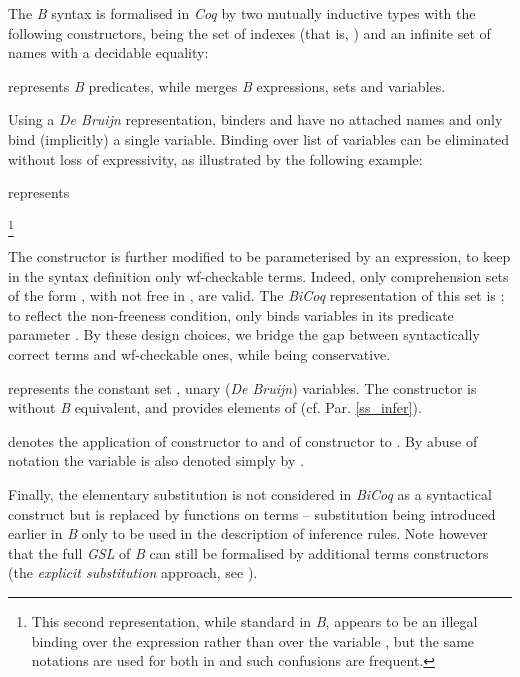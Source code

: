 \documentclass{llncs}
\begin{document}
The \emph{B} syntax is formalised in \emph{Coq} by two mutually inductive types with the 
following constructors,  being the set of indexes (that is, 
) and  an infinite set of names with a decidable 
equality:

 represents \emph{B} predicates, while  merges \emph{B} expressions, sets and 
variables.

Using a \emph{De Bruijn} representation, binders  and  have no attached 
names and only bind (implicitly) a single variable. Binding over list of variables can be 
eliminated without loss of expressivity, as illustrated by the following example:

\begin{example}\label{ss_syntax_e2}\small

represents

\footnote{This second representation, while standard in \emph{B}, appears to be an illegal 
binding over the expression  rather than over the variable , but the same 
notations are used for both in \cite{abr:1} and such confusions are frequent.}
\end{example}
The constructor  is further modified to be parameterised by an expression, to keep 
in the syntax definition only wf-checkable terms. Indeed, only comprehension sets of the form
, with  not free in , are valid. The \emph{BiCoq} 
representation of this set is ; to reflect the non-freeness condition,
 only binds variables in its predicate parameter . By these design choices, we 
bridge the gap between syntactically correct terms and wf-checkable ones, while being 
conservative.

 represents the constant set ,  unary (\emph{De Bruijn}) 
variables. The constructor  is without \emph{B} equivalent, and provides elements of 
 (cf. Par. \ref{ss_infer}).

\begin{notation}\small denotes the application of constructor  to 
 and  of constructor  to . By abuse of notation 
the variable  is also denoted simply by .
\end{notation}

Finally, the elementary substitution is not considered in \emph{BiCoq} as a syntactical 
construct but is replaced by functions on terms -- substitution being introduced earlier in
\emph{B} only to be used in the description of inference rules. Note however that the full 
\emph{GSL} of \emph{B} can still be formalised by additional terms constructors (the 
\emph{explicit substitution} approach, see \cite{aba:1,cur:1}).
\end{document}

